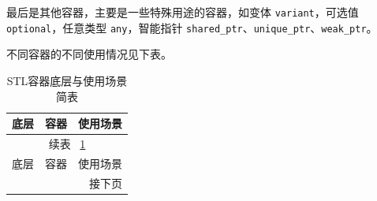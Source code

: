 最后是其他容器，主要是一些特殊用途的容器，如变体 \verb|variant|，可选值 \verb|optional|，任意类型 \verb|any|，智能指针 \verb|shared_ptr|、\verb|unique_ptr|、\verb|weak_ptr|。

不同容器的不同使用情况见下表。

\begin{longtable}[c]{l|l|p{7cm}}
    \caption{STL容器底层与使用场景简表}\label{tab:stl-containers}\\
    \toprule
    底层 & 容器 & 使用场景 \\
    \midrule
    \endfirsthead          %

    \multicolumn{3}{c}{\footnotesize 续表~ \ref{tab:stl-containers} }\\[.5ex]
    \toprule
    底层 & 容器 & 使用场景 \\
    \midrule
    \endhead               %

    \midrule
    \multicolumn{3}{r}{\footnotesize 接下页}
    \endfoot               %

    \bottomrule
    \endlastfoot           %


\end{longtable}
